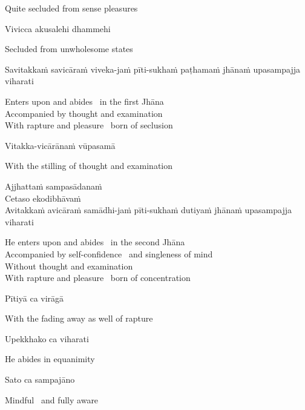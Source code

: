 \begin{cprenglish}
  Quite secluded from sense pleasures
\end{cprenglish}

Vivicca akusalehi dhammehi

\begin{cprenglish}
  Secluded from unwholesome states
\end{cprenglish}

Savitakkaṁ savicāraṁ viveka-jaṁ pīti-sukhaṁ paṭhamaṁ jhānaṁ upasampajja viharati

\begin{cprenglish}
  Enters upon and abides \breathmark\ in the first Jhāna\\
  Accompanied by thought and examination\\
  With rapture and pleasure \breathmark\ born of seclusion
\end{cprenglish}

Vitakka-vicārānaṁ vūpasamā

\begin{cprenglish}
  With the stilling of thought and examination
\end{cprenglish}

Ajjhattaṁ sampasādanaṁ\\
Cetaso ekodibhāvaṁ\\
Avitakkaṁ avicāraṁ samādhi-jaṁ pīti-sukhaṁ dutiyaṁ jhānaṁ upasampajja viharati

\begin{cprenglish}
  He enters upon and abides \breathmark\ in the second Jhāna\\
  Accompanied by self-confidence \breathmark\ and singleness of mind\\
  Without thought and examination\\
  With rapture and pleasure \breathmark\ born of concentration
\end{cprenglish}

Pītiyā ca virāgā

\begin{cprenglish}
  With the fading away as well of rapture
\end{cprenglish}

Upekkhako ca viharati

\begin{cprenglish}
  He abides in equanimity
\end{cprenglish}

Sato ca sampajāno

\begin{cprenglish}
  Mindful \breathmark\ and fully aware
\end{cprenglish}

